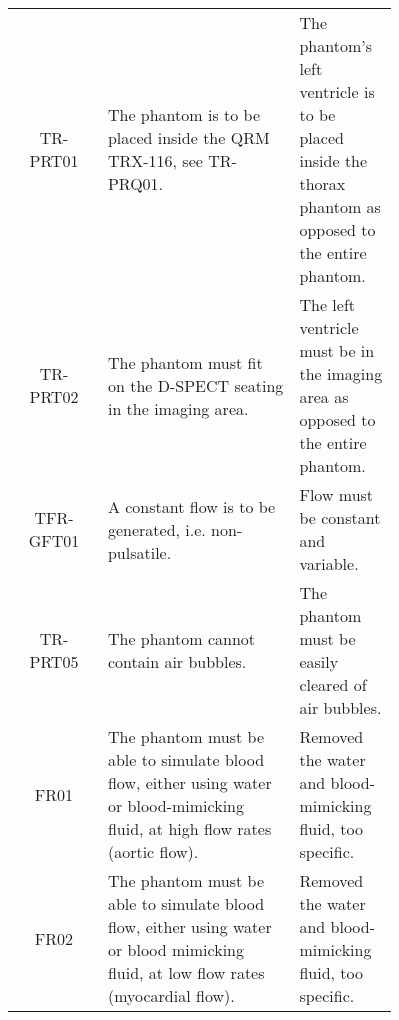 {\begin{longtable}{|c|p{0.5\linewidth}|p{0.26\linewidth}|}
	TR-PRT01 & The phantom is to be placed inside the QRM TRX-116, see TR-PRQ01. & The phantom's left ventricle is to be placed inside the thorax phantom as opposed to the entire phantom.\\
	TR-PRT02 & The phantom must fit on the D-SPECT seating in the imaging area. & The left ventricle must be in the imaging area as opposed to the entire phantom.\\
	TFR-GFT01 & A constant flow is to be generated, i.e. non-pulsatile. & Flow must be constant and variable.\\
	TR-PRT05 			& The phantom cannot contain air bubbles. & The phantom must be easily cleared of air bubbles. \\
	FR01				& The phantom must be able to simulate blood flow, either using water or blood-mimicking fluid, at high flow rates (aortic flow). & Removed the water and blood-mimicking fluid, too specific. \\
	FR02				& The phantom must be able to simulate blood flow, either using water or blood mimicking fluid, at low flow rates (myocardial flow). & Removed the water and blood-mimicking fluid, too specific. \\
		\hline
	\end{longtable}
}

\normalsize